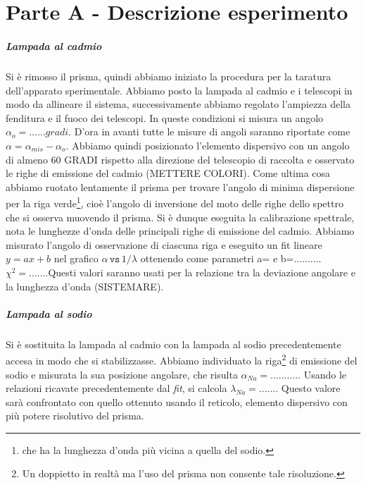 \documentclass[10pt,a4paper]{article}
\begin{document}
\section{Parte A - Descrizione esperimento}
\subparagraph{Lampada al cadmio}
Si è rimosso il prisma, quindi abbiamo iniziato la procedura per la taratura dell'apparato sperimentale. Abbiamo posto la lampada al cadmio e i telescopi in modo da allineare il sistema, successivamente abbiamo regolato l'ampiezza della fenditura e il fuoco dei telescopi. In queste condizioni si misura un angolo $\alpha_o=......gradi$. D'ora in avanti tutte le misure di angoli saranno riportate come $\alpha=\alpha_{mis}-\alpha_o$. Abbiamo quindi posizionato l'elemento dispersivo con un angolo di almeno 60 GRADI rispetto alla direzione del telescopio di raccolta e osservato le righe di emissione del cadmio (METTERE COLORI). Come ultima cosa abbiamo ruotato lentamente il prisma per trovare l'angolo di minima dispersione per la riga verde\footnote{che ha la lunghezza d'onda più vicina a quella del sodio.}, cioè l'angolo di inversione del moto delle righe dello spettro che si osserva muovendo il prisma. 
Si è dunque eseguita la calibrazione spettrale, nota le lunghezze d'onda delle principali righe di emissione del cadmio. Abbiamo misurato l'angolo di osservazione di ciascuna riga e eseguito un fit lineare $y=ax+b$ nel grafico $\alpha\, \texttt{vs}\, 1/\lambda$ ottenendo come parametri a=  e b=.......... $\chi^2=......$.Questi valori saranno usati per la relazione tra la deviazione angolare e la lunghezza d'onda (SISTEMARE).\\
\subparagraph{Lampada al sodio}
Si è sostituita la lampada al cadmio con la lampada al sodio precedentemente accesa in modo che si stabilizzasse. Abbiamo individuato la riga\footnote{Un doppietto in realtà ma l'uso del prisma non consente tale risoluzione.} di emissione del sodio e misurata la sua posizione angolare, che risulta $\alpha_{Na}=..........$. Usando le relazioni ricavate precedentemente dal \emph{fit}, si calcola $\lambda_{Na}=......$. Questo valore sarà confrontato con quello ottenuto usando il reticolo, elemento dispersivo con più potere risolutivo del prisma.
\end{document}
